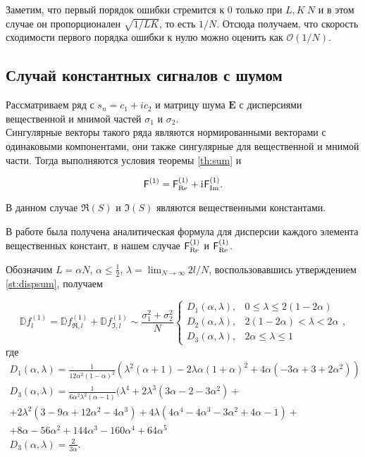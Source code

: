 \documentclass[specialist,
               substylefile = spbu.rtx,
               subf,href,colorlinks=true, 12pt]{disser}
\begin{document}
Заметим, что первый порядок ошибки стремится к $0$ только при $L, K ~ N$ и в этом случае он пропорционален $\sqrt{1/LK}$, то есть $1/N$. Отсюда получаем, что скорость сходимости первого порядка ошибки к нулю можно оценить как $\mathcal{O}(1/N)$. 

\subsection{Случай константных сигналов с шумом}

Рассматриваем ряд с $s_n = c_1 + ic_2$ и матрицу шума $\mathbf{E}$ с дисперсиями вещественной и мнимой частей $\sigma_1$ и $\sigma_2$.\\
Сингулярные векторы такого ряда являются нормированными векторами с одинаковыми компонентами, они также сингулярные для вещественной и мнимой части. Тогда выполняются условия теоремы \ref{th:sum} и

$$\textsf{F}^{(1)} = \textsf{F}^{(1)}_{\Re} + \mathrm{i}\mkern1mu\textsf{F}^{(1)}_{\Im}.$$

В данном случае $\Re(S)$ и $\Im(S)$ являются вещественными константами.

В работе \cite{Vlas2008} была получена аналитическая формула для дисперсии каждого элемента вещественных констант, в нашем случае $\textsf{F}^{(1)}_{\Re}$ и $\textsf{F}^{(1)}_{\Re}$.

Обозначим $L = \alpha N$, $\alpha \leq \frac{1}{2}$, $\lambda = \lim_{N\to\infty} 2 l / N$, воспользовавшись утверждением \ref{st:dispsum}, получаем

$$
\mathbb{D} f^{(1)}_l = \mathbb{D} f^{(1)}_{\Re, l} + \mathbb{D} f^{(1)}_{\Im, l} \sim \frac{\sigma^2_1 + \sigma^2_2}{N}
\begin{cases}
	D_1(\alpha, \lambda), &\text{$0 \leq \lambda \leq 2 (1 - 2\alpha)$}\\
	D_2(\alpha, \lambda), &\text{$2 (1 - 2\alpha) < \lambda < 2\alpha$}\\
	D_3(\alpha, \lambda), &\text{$2\alpha \leq \lambda \leq 1$}
\end{cases},
$$
где
\begin{gather*}
	D_1(\alpha, \lambda) = \frac{1}{12 \alpha^2(1 - \alpha)^2} (\lambda^2(\alpha + 1) - 2\lambda\alpha(1 + \alpha)^2 + 4 \alpha(-3\alpha + 3 + 2\alpha^2))\\
	D_3(\alpha, \lambda) = \frac{1}{6 \alpha^2\lambda^2 (\alpha - 1)} (\lambda^4 + 2\lambda^3(3\alpha -2 -3\alpha^2) + \\
	+ 2\lambda^2(3 - 9\alpha + 12\alpha^2 - 4\alpha^3) + 4\lambda(4 \alpha^4 - 4\alpha^3 - 3\alpha^2 + 4\alpha - 1) +\\
	+ 8\alpha - 56 \alpha^2 + 144\alpha^3 - 160\alpha^4 + 64\alpha^5\\
	D_3(\alpha, \lambda) = \frac{2}{3\alpha}.\\
\end{gather*}
\end{document}
